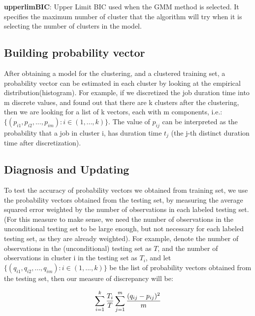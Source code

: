 \documentclass{article}
\begin{document}
\begin{flushleft}
\textbf{upperlimBIC}: Upper Limit BIC used when the GMM method is selected. It specifies the maximum number of cluster that the algorithm will try when it is selecting the number of clusters in the model.
\end{flushleft}

\subsection{Building probability vector}

\begin{flushleft}
After obtaining a model for the clustering, and a clustered training set, a probability vector can be estimated in each cluster by looking at the empirical distribution(histogram). For example, if we discretized the job duration time into m discrete values, and found out that there are k clusters after the clustering, then we are looking for a list of k vectors, each with m components, i.e.:
$\{(p_{i1}, p_{i2}, ..., p_{im}) : i \in (1,...,k)\}$. The value of $p_{ij}$ can be interpreted as the probability that a job in cluster i, has duration time $t_j$ (the j-th distinct duration time after discretization).
\end{flushleft}

\subsection{Diagnosis and Updating}

\begin{flushleft}
To test the accuracy of probability vectors we obtained from training set, we use the probability vectors obtained from the testing set, by measuring the average squared error weighted by the number of observations in each labeled testing set. (For this measure to make sense, we need the number of observations in the unconditional testing set to be large enough, but not necessary for each labeled testing set, as they are already weighted).
For example, denote the number of observations in the (unconditional) testing set as $T$, and the number of observations in cluster i in the testing set as $T_i$, and let $\{(q_{i1}, q_{i2}, ..., q_{im}) : i \in (1,...,k)\}$ be the list of probability vectors obtained from the testing set, then our measure of discrepancy will be:
\end{flushleft}

\begin{flushleft}
\begin{equation}
\centering
        \sum_{i = 1} ^{k} \frac{T_i}{T} \sum_{j = 1}^{m} \frac{(q_{ij} - p_{ij})^2}{m}
\end{equation}
\end{flushleft}
\end{document}
